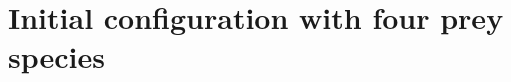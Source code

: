 \section{Initial configuration with four prey species}

\paragraph{}
\paragraph{}
\paragraph{}
\paragraph{}
\paragraph{}
\paragraph{}
\paragraph{}
